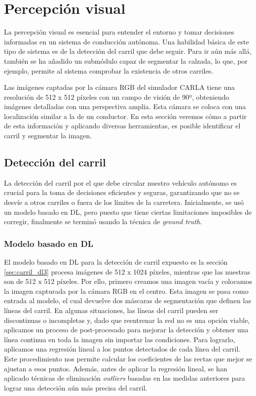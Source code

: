 \section{Percepción visual}

La percepción visual es esencial para entender el entorno y tomar decisiones informadas en un sistema de conducción autónoma. Una habilidad básica de este tipo de sistema es de la detección del carril que debe seguir. Para ir aún más allá, también se ha añadido un submódulo capaz de segmentar la calzada, lo que, por ejemplo, permite al sistema comprobar la existencia de otros carriles.

Las imágenes captadas por la cámara RGB del simulador CARLA tiene una resolución de 512 x 512 píxeles con un campo de visión de 90º, obteniendo imágenes detalladas con una perspectiva amplia. Esta cámara se coloca con una localización similar a la de un conductor. En esta sección veremos cómo a partir de esta información y aplicando diversas herramientas, es posible identificar el carril y segmentar la imagen.

\subsection{Detección del carril}

La detección del carril por el que debe circular nuestro vehículo autónomo es crucial para la toma de decisiones eficientes y seguras, garantizando que no se desvíe a otros carriles o fuera de los límites de la carretera. Inicialmente, se usó un modelo basado en \ac{DL}, pero puesto que tiene ciertas limitaciones imposibles de corregir, finalmente se terminó usando la técnica de \textit{ground truth}.

\subsubsection{Modelo basado en \ac{DL}}

El modelo basado en \ac{DL} para la detección de carril expuesto es la sección \ref{sec:carril_dl3} procesa imágenes de 512 x 1024 píxeles, mientras que las nuestras son de 512 x 512 píxeles. Por ello, primero creamos una imagen vacía y colocamos la imagen capturada por la cámara RGB en el centro. Esta imagen se pasa como entrada al modelo, el cual devuelve dos máscaras de segmentación que definen las líneas del carril. En algunas situaciones, las líneas del carril pueden ser discontinuas o incompletas y, dado que reentrenar la red no es una opción viable, aplicamos un proceso de post-procesado para mejorar la detección y obtener una línea continua en toda la imagen sin importar las condiciones. Para lograrlo, aplicamos una regresión lineal a los puntos detectados de cada línea del carril. Este procedimiento nos permite calcular los coeficientes de las rectas que mejor se ajustan a esos puntos. Además, antes de aplicar la regresión lineal, se han aplicado técnicas de eliminación \textit{outliers} basadas en las medidas anteriores para lograr una detección aún más precisa del carril.

